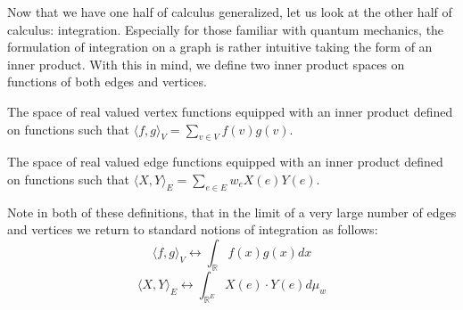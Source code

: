 Now that we have one half of calculus generalized, let us look at the
other half of calculus: integration. Especially for those familiar
with quantum mechanics, the formulation of integration on a graph is
rather intuitive taking the form of an inner product. With this in
mind, we define two inner product spaces on functions of both edges
and vertices. 
\begin{definition}
The space of real valued vertex functions equipped with an inner
product defined on functions such that \(\langle f, g \rangle_V =
\sum_{v \in V}f(v)g(v)\). 
\end{definition}
\begin{definition}
The space of real valued edge functions equipped with an inner product
defined on functions such that \(\langle X, Y \rangle_E = \sum_{e \in
  E}w_e X(e)Y(e)\). 
\end{definition}
Note in both of these definitions, that in the limit of a very large
number of edges and vertices we return to standard notions of
integration as follows: 
\[
\langle f, g \rangle_V \leftrightarrow \int_{\mathbb{R}}f(x)g(x)dx
\]
\[
\langle X, Y \rangle_E \leftrightarrow \int_{\mathbb{R}^E}X(e)\cdot Y(e)d\mu_w
\]


